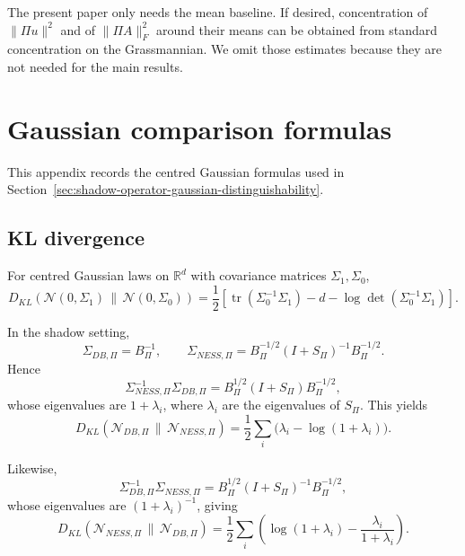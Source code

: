 \documentclass[11pt,a4paper]{article}
\numberwithin{equation}{section}
\theoremstyle{thmcompact}
\theoremstyle{remark}
\begin{document}
The present paper only needs the mean baseline. If desired, concentration of \(\|\Pi u\|^2\) and of \(\|\Pi A\|_F^2\) around their means can be obtained from standard concentration on the Grassmannian. We omit those estimates because they are not needed for the main results.

\section{Gaussian comparison formulas}
\label{app:gaussian_comparison_formulas}

This appendix records the centred Gaussian formulas used in Section~\ref{sec:shadow-operator-gaussian-distinguishability}.

\subsection{KL divergence}

For centred Gaussian laws on \(\mathbb R^d\) with covariance matrices \(\Sigma_1,\Sigma_0\),
\begin{equation}
D_{KL}\!\left(\mathcal N(0,\Sigma_1)\,\|\,\mathcal N(0,\Sigma_0)\right)
=
\frac12\left[
\operatorname{tr}(\Sigma_0^{-1}\Sigma_1)-d-\log\det(\Sigma_0^{-1}\Sigma_1)
\right].
\end{equation}

In the shadow setting,
\begin{equation}
\Sigma_{DB,\Pi}=B_\Pi^{-1},
\qquad
\Sigma_{NESS,\Pi}=B_\Pi^{-1/2}(I+S_\Pi)^{-1}B_\Pi^{-1/2}.
\end{equation}
Hence
\begin{equation}
\Sigma_{NESS,\Pi}^{-1}\Sigma_{DB,\Pi}
=
B_\Pi^{1/2}(I+S_\Pi)B_\Pi^{-1/2},
\end{equation}
whose eigenvalues are \(1+\lambda_i\), where \(\lambda_i\) are the eigenvalues of \(S_\Pi\). This yields
\begin{equation}
D_{KL}\!\left(\mathcal N_{DB,\Pi}\,\|\,\mathcal N_{NESS,\Pi}\right)
=
\frac12\sum_i\bigl(\lambda_i-\log(1+\lambda_i)\bigr).
\end{equation}

Likewise,
\begin{equation}
\Sigma_{DB,\Pi}^{-1}\Sigma_{NESS,\Pi}
=
B_\Pi^{1/2}(I+S_\Pi)^{-1}B_\Pi^{-1/2},
\end{equation}
whose eigenvalues are \((1+\lambda_i)^{-1}\), giving
\begin{equation}
D_{KL}\!\left(\mathcal N_{NESS,\Pi}\,\|\,\mathcal N_{DB,\Pi}\right)
=
\frac12\sum_i\left(\log(1+\lambda_i)-\frac{\lambda_i}{1+\lambda_i}\right).
\end{equation}
\end{document}
